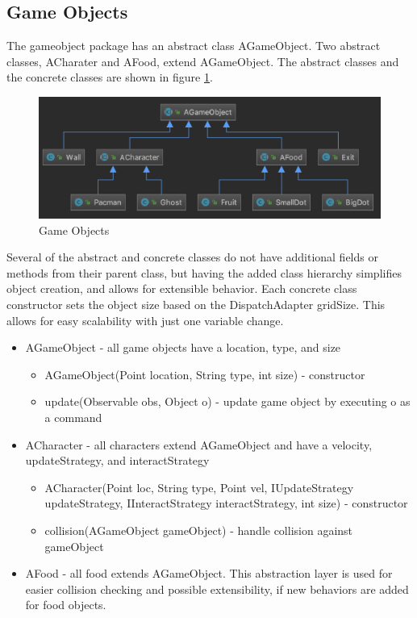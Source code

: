 \documentclass[letterpaper, 11pt]{article}
\begin{document}
\subsection{Game Objects}
The gameobject package has an abstract class AGameObject. Two abstract classes, ACharater and AFood, extend AGameObject. The abstract classes and the concrete classes are shown in figure \ref{fig1}. 

\begin{figure}[htbp] 
  \centering
  \includegraphics[width=.85\linewidth]{objects.png} 
  \caption{Game Objects}
  \label{fig1} 
\end{figure}

Several of the abstract and concrete classes do not have additional fields or methods from their parent class, but having the added class hierarchy simplifies object creation, and allows for extensible behavior. Each concrete class constructor sets the object size based on the DispatchAdapter gridSize. This allows for easy scalability with just one variable change.

\begin{itemize}
  \item AGameObject - all game objects have a location, type, and size
  \begin{itemize}
    \item AGameObject(Point location, String type, int size) - constructor
    \item update(Observable obs, Object o) - update game object by executing o as a command
  \end{itemize}
  \item ACharacter - all characters extend AGameObject and have a velocity, updateStrategy, and interactStrategy
  \begin{itemize}
    \item ACharacter(Point loc, String type, Point vel, IUpdateStrategy updateStrategy, IInteractStrategy interactStrategy, int size) - constructor
    \item collision(AGameObject gameObject) - handle collision against gameObject
  \end{itemize}
  \item AFood - all food extends AGameObject. This abstraction layer is used for easier collision checking and possible extensibility, if new behaviors are added for food objects.
\end{itemize}
\end{document}
